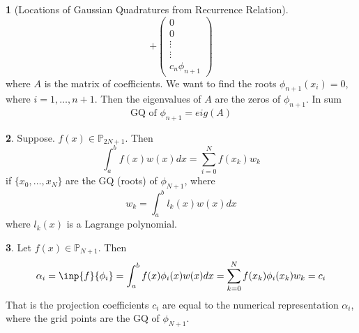 \documentclass[12pt]{article}
\theoremstyle{definition}
\newtheorem{theorem}{\color{ForestGreen}{\textbf{Theorem}}}
\begin{document}
\begin{theorem}[Locations of Gaussian Quadratures from Recurrence Relation]
\begin{equation}
+
\begin{pmatrix}
0 \\ 0 \\ \vdots \\ \vdots \\ c_n \phi_{n+1}
\end{pmatrix}
\end{equation}
where $A$ is the matrix of coefficients. We want to find the roots $\phi_{n+1}(x_i) = 0$, where $i=1,\ldots,n+1$. Then the eigenvalues of $A$ are the zeros of $\phi_{n+1}$. In sum
\begin{equation}
\text{GQ of } \phi_{n+1} = eig(A)
\end{equation}
\end{theorem}

\begin{theorem}
Suppose. $f(x) \in \mathbb{P}_{2N+1}$. Then
\begin{equation}
\int_{a}^b f(x)w(x)dx = \sum_{i=0}^N f(x_k) w_k
\end{equation}
if $\{x_0, \ldots, x_N\}$ are the GQ (roots) of $\phi_{N+1}$, where
\begin{equation}
w_k = \int_a^b l_k(x)w(x)dx
\end{equation}
where $l_k(x)$ is a Lagrange polynomial.
\end{theorem}

\begin{theorem}
Let $f(x) \in \mathbb{P}_{N+1}$. Then
\begin{equation}
\alpha_i = \inp{f}{\phi_i} = \int_a^b f(x)\phi_i(x)w(x)dx = \sum_{k=0}^N f(x_k)\phi_i(x_k)w_k = c_i
\end{equation}
That is the projection coefficients $c_i$ are equal to the numerical representation $\alpha_i$, where the grid points are the GQ of $\phi_{N+1}$.
\end{theorem}
\end{document}

